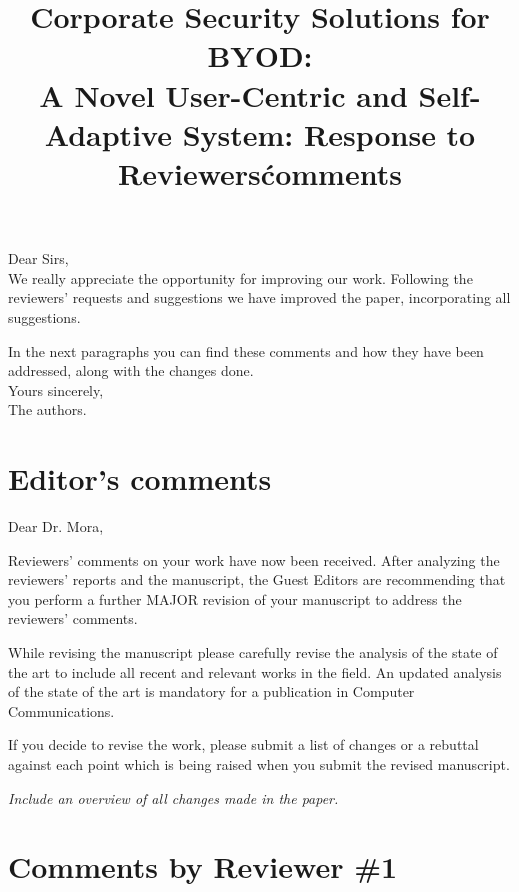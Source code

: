 \documentclass[preprint]{elsarticle}
\begin{document}

\title{Corporate Security Solutions for BYOD:\\ A Novel User-Centric and Self-Adaptive System: Response to Reviewers\' comments}

\noindent
Dear Sirs,\\

We really appreciate the opportunity for improving our work. Following the reviewers' requests and suggestions we have improved the paper, incorporating all suggestions.  

In the next paragraphs you can find these comments and how they have been addressed, along with the changes done.\\

\noindent
Yours sincerely,\\
The authors.


\section{Editor's comments}
Dear Dr. Mora,

Reviewers' comments on your work have now been received. After analyzing the reviewers' reports and the manuscript, the Guest Editors are recommending that you perform a further MAJOR revision of your manuscript to address the reviewers' comments.

While revising the manuscript please carefully revise the analysis of the state of the art to include all recent and relevant works in the field.
An updated analysis of the state of the art is mandatory for a publication in Computer Communications.

If you decide to revise the work, please submit a list of changes or a rebuttal against each point which is being raised when you submit the revised manuscript.



\textit{Include an overview of all changes made in the paper.}

\section{Comments by Reviewer \#1}
\end{document}
